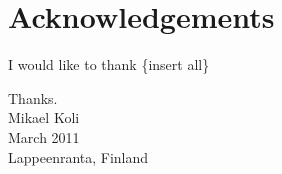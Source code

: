 \section*{Acknowledgements}

I would like to thank \{insert all\}

Thanks.\\

Mikael Koli\\
March 2011\\
Lappeenranta, Finland\\
